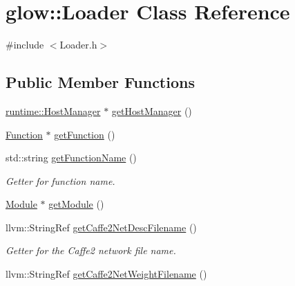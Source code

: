 \hypertarget{classglow_1_1_loader}{}\section{glow\+:\+:Loader Class Reference}
\label{classglow_1_1_loader}


{\ttfamily \#include $<$Loader.\+h$>$}

\subsection*{Public Member Functions}
\begin{DoxyCompactItemize}
\item 
\hyperlink{classglow_1_1runtime_1_1_host_manager}{runtime\+::\+Host\+Manager} $\ast$ \hyperlink{classglow_1_1_loader_a8c264157d286f806b93c09d08a06d004}{get\+Host\+Manager} ()
\item 
\hyperlink{classglow_1_1_function}{Function} $\ast$ \hyperlink{classglow_1_1_loader_aab4ded493e718300df251a1841523c3d}{get\+Function} ()
\item 
\mbox{\label{classglow_1_1_loader_a73fb01768b1c20f41e2121f5585817d2}} 
std\+::string \hyperlink{classglow_1_1_loader_a73fb01768b1c20f41e2121f5585817d2}{get\+Function\+Name} ()
\begin{DoxyCompactList}\small\item\em Getter for function name. \end{DoxyCompactList}\item 
\hyperlink{classglow_1_1_module}{Module} $\ast$ \hyperlink{classglow_1_1_loader_a24825fa4a696f20bc4e2eb90ac840f16}{get\+Module} ()
\item 
\mbox{\label{classglow_1_1_loader_aa417156999972e8cdb4f9515ee2995a0}} 
llvm\+::\+String\+Ref \hyperlink{classglow_1_1_loader_aa417156999972e8cdb4f9515ee2995a0}{get\+Caffe2\+Net\+Desc\+Filename} ()
\begin{DoxyCompactList}\small\item\em Getter for the Caffe2 network file name. \end{DoxyCompactList}\item 
\mbox{\label{classglow_1_1_loader_a1053137878cd321ac5152f93b1a9366a}} 
llvm\+::\+String\+Ref \hyperlink{classglow_1_1_loader_a1053137878cd321ac5152f93b1a9366a}{get\+Caffe2\+Net\+Weight\+Filename} ()

\end{DoxyCompactItemize}
